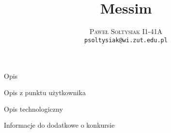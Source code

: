 \documentclass{article}
\title{Messim}
\author{\textsc{Paweł Sołtysiak I1-41A} \\ \texttt{psoltysiak@wi.zut.edu.pl}}
\begin{document}
\maketitle

Opis

Opis z punktu użytkownika

Opis technologiczny

Informacje do dodatkowe o konkursie
\end{document}
